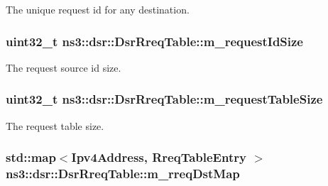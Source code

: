 The unique request id for any destination. 

\subsubsection[{\texorpdfstring{m\+\_\+request\+Id\+Size}{m_requestIdSize}}]{\setlength{\rightskip}{0pt plus 5cm}uint32\+\_\+t ns3\+::dsr\+::\+Dsr\+Rreq\+Table\+::m\+\_\+request\+Id\+Size\hspace{0.3cm}{\ttfamily [private]}}\hypertarget{classns3_1_1dsr_1_1DsrRreqTable_abc5546adc8c2dd2b434f583a5c8299d9}{}\label{classns3_1_1dsr_1_1DsrRreqTable_abc5546adc8c2dd2b434f583a5c8299d9}


The request source id size. 

\subsubsection[{\texorpdfstring{m\+\_\+request\+Table\+Size}{m_requestTableSize}}]{\setlength{\rightskip}{0pt plus 5cm}uint32\+\_\+t ns3\+::dsr\+::\+Dsr\+Rreq\+Table\+::m\+\_\+request\+Table\+Size\hspace{0.3cm}{\ttfamily [private]}}\hypertarget{classns3_1_1dsr_1_1DsrRreqTable_aa0a03f05e32aa1ac047ad091154e8215}{}\label{classns3_1_1dsr_1_1DsrRreqTable_aa0a03f05e32aa1ac047ad091154e8215}


The request table size. 

\subsubsection[{\texorpdfstring{m\+\_\+rreq\+Dst\+Map}{m_rreqDstMap}}]{\setlength{\rightskip}{0pt plus 5cm}std\+::map$<${\bf Ipv4\+Address}, {\bf Rreq\+Table\+Entry} $>$ ns3\+::dsr\+::\+Dsr\+Rreq\+Table\+::m\+\_\+rreq\+Dst\+Map\hspace{0.3cm}{\ttfamily [private]}}\hypertarget{classns3_1_1dsr_1_1DsrRreqTable_a7cb611a29059faab6ffb9532e15d4166}{}\label{classns3_1_1dsr_1_1DsrRreqTable_a7cb611a29059faab6ffb9532e15d4166}


